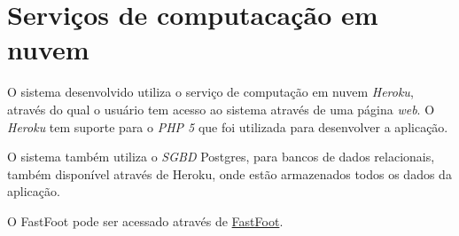 \documentclass[11pt,a4paper]{article}
\begin{document}
	\section*{Serviços de computacação em nuvem}
    	O sistema desenvolvido utiliza o serviço de computação em nuvem \textit{Heroku}, através do qual o usuário tem acesso ao sistema através de uma página \textit{web}. O \textit{Heroku} tem suporte para o \textit{PHP 5} que foi utilizada para desenvolver  a aplicação. 
        
        O sistema também utiliza o \textit{SGBD} Postgres, para bancos de dados relacionais, também disponível através de Heroku, onde estão armazenados todos os dados da aplicação.
        
        O FastFoot pode ser acessado através de \href{https://fastfoot.herokuapp.com/}{FastFoot}.
\end{document}

